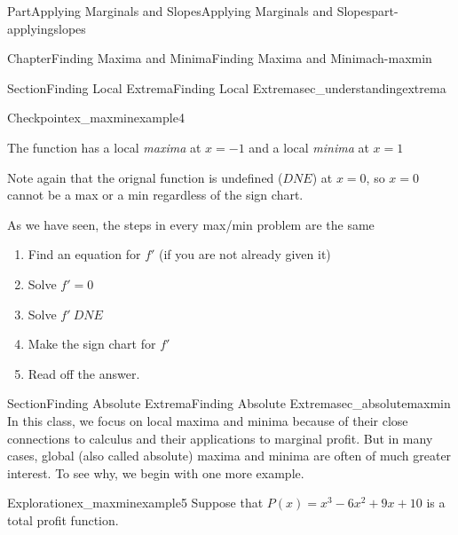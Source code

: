 \documentclass{tufte-book}
\numberwithin{equation}{chapter}
\begin{document}
\begin{partptx}{Part}{Applying Marginals and Slopes}{}{Applying Marginals and Slopes}{}{}{part-applyingslopes}
\begin{chapterptx}{Chapter}{Finding Maxima and Minima}{}{Finding Maxima and Minima}{}{}{ch-maxmin}
\begin{sectionptx}{Section}{Finding Local Extrema}{}{Finding Local Extrema}{}{}{sec_understandingextrema}
\begin{inlineexercise}{Checkpoint}{}{ex_maxminexample4}
\begin{image}{0.125}{0.75}{0.125}{}
{
}%
\end{image}%
%
\par
The function has a local \emph{maxima} at \(x=-1\) and a local \emph{minima} at \(x=1\)%
\par
Note again that the orignal function is undefined (\(DNE\)) at \(x=0\), so \(x=0\) cannot be a max or a min regardless of the sign chart.%
\end{inlineexercise}%
As we have seen, the steps in every max\slash{}min problem are the same%
\begin{enumerate}
\item{}Find an equation for \(f'\) (if you are not already given it)%
\item{}Solve \(f'=0\)%
\item{}Solve \(f'\ DNE\)%
\item{}Make the sign chart for \(f'\)%
\item{}Read off the answer.%
\end{enumerate}
%
\end{sectionptx}
%
%
\typeout{************************************************}
\typeout{************************************************}
%
\begin{sectionptx}{Section}{Finding Absolute Extrema}{}{Finding Absolute Extrema}{}{}{sec_absolutemaxmin}
In this class, we focus on local maxima and minima because of their close connections to calculus and their applications to marginal profit. But in many cases, global (also called absolute) maxima and minima are often of much greater interest. To see why, we begin with one more example.%
\begin{exploration}{Exploration}{}{ex_maxminexample5}%
Suppose that \(P(x) = x^3 - 6x^2 + 9x +10 \) is a total profit function.%
\begin{enumerate}[font=\bfseries,label=(\alph*),ref=\alph*]%

\end{enumerate}
\end{exploration}
\end{sectionptx}
\end{chapterptx}
\end{partptx}
\end{document}

